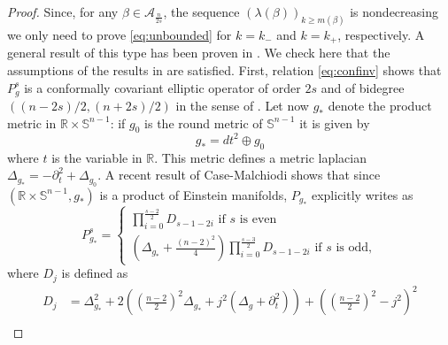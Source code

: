 \documentclass[10pt]{amsart}
\numberwithin{equation}{section}
\newcommand{\R}{\mathbb{R}}
\def\ep{{\varepsilon}}
\def \ep{\epsilon}
\theoremstyle{plain}
\theoremstyle{remark}
\begin{document}
\begin{proof}
Since, for any $\beta \in \mathcal{A}_{\frac{n}{2s}}$, the sequence $(\lambda(\beta))_{k \ge m(\beta)}$ is nondecreasing we only need to prove \eqref{eq:unbounded} for $k=k_-$ and $k=k_+$, respectively. A general result of this type has been proven in \cite[Theorem 1.3, Theorem 4.1]{AmmannJammes}. We check here that the assumptions of the results in \cite{AmmannJammes} are satisfied. First, relation \eqref{eq:confinv} shows that $P_g^s$ is a conformally covariant elliptic operator of order $2s$ and of bidegree $((n-2s)/2, (n+2s)/2)$ in the sense of \cite[Definition 2.2]{AmmannJammes}.
Let now $g_*$ denote the product metric in $ \mathbb{R} \times \mathbb{S}^{n-1}$: if $g_0$ is the round metric of $\mathbb{S}^{n-1}$ it is given by 
$$ g_{*} = dt^2  \oplus g_0 $$
where $t$ is the variable in $\R$. This metric defines a metric laplacian $\Delta_{g_*} = -\partial_t^2 + \Delta_{g_0}$. A recent result of Case-Malchiodi \cite[Theorem 1.1]{CaseMalchiodi} shows that since $( \mathbb{R} \times \mathbb{S}^{n-1}, g_*)$ is a product of Einstein manifolds, $P_{g_*}$ explicitly writes as 
$$ P_{g_{*}}^s = \begin{cases} \prod_{i=0}^{\frac{s-2}{2}} D_{s-1-2i} \text{ if } s \text{ is even} \\  \left( \Delta_{g_*} + \frac{(n-2)^2}{4} \right) \prod_{i=0}^{\frac{s-3}{2}} D_{s-1-2i} \text{ if } s \text{ is odd}, \end{cases}$$
where $D_j$ is defined as
\begin{equation*}\begin{split} D_j & = \Delta_{g_*}^2 + 2\left( \left(\frac{n-2}{2}\right)^2 \Delta_{g_*} + j^2 \left( \Delta_g + \partial_t^2 \right) \right) + \left(\left(\frac{n-2}{2}\right)^2 - j^2\right)^2 \\

\end{split}
\end{equation*}
\end{proof}
\end{document}

